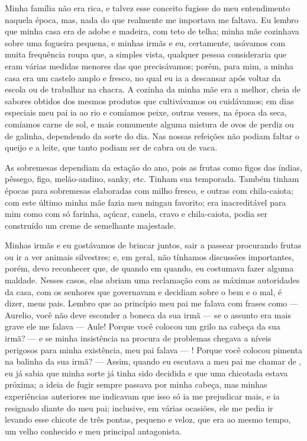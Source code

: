 Minha família não era rica, e talvez esse conceito fugisse do meu entendimento naquela época, mas, nada do que realmente me importava me faltava.
Eu lembro que minha casa era de adobe e madeira, com teto de telha; minha mãe cozinhava sobre uma fogueira pequena, e minhas irmãs e eu, certamente, usávamos com muita frequência roupa que, a simples vista, qualquer pessoa consideraria que eram várias medidas menores das que precisávamos;
porém, para mim, a minha casa era um castelo amplo e fresco, no qual eu ia a descansar após voltar da escola ou de trabalhar na chacra. 
A cozinha da minha mãe era a melhor, cheia de sabores obtidos dos mesmos produtos que cultivávamos ou cuidávamos; em dias especiais meu pai ia ao rio e comíamos peixe, outras vesses, na época da seca, comíamos carne de sol, e mais comumente alguma mistura de ovos de perdiz ou de galinha, dependendo da sorte do dia.
Nas nossas refeições não podiam faltar o queijo e a leite, que tanto podiam ser de cabra ou de vaca.
\begin{comment}
\begin{wrapfigure}{r}{0.35\textwidth}
  \vspace{-10pt}
  \begin{center}
    \texttt{[image: opuntia.eps]}
    \caption{Figo das índias.}
  \end{center}
  \vspace{-30pt}
\end{wrapfigure}
\end{comment}
As sobremesas dependiam da estação do ano, pois as frutas como figos das índias, pêssego, figo, melão-andino, sanky, etc. Tinham sua temporada. Também tinham épocas para sobremesas elaboradas com milho fresco, e outras com chila-caiota; com este último minha mãe fazia meu mingau favorito; era inacreditável para mim como com só farinha, açúcar, canela, cravo e chila-caiota, podia ser construído um creme de semelhante majestade.

Minhas irmãs e eu gostávamos de brincar juntos, sair a passear procurando frutas ou ir a ver animais silvestres; e, em geral, não tínhamos discussões importantes, porém, devo reconhecer que, de quando em quando, eu costumava fazer alguma maldade.
Nesses casos, elas abriam uma reclamação com as máximas autoridades da casa, com os senhores que governavam e decidiam sobre o bem e o mal, é dizer, meus pais. Lembro que ao princípio meu pai me falava com frases como --- Aurelio, você não deve esconder a boneca da sua irmã --- se o assunto era mais grave ele me falava --- Aule! Porque você colocou um grilo na cabeça da sua irmã? --- e se minha insistência na procura de problemas chegava a níveis perigosos para minha existência, meu pai falava --- \Aulicha! Porque você colocou pimenta na balinha da sua irmã? ---
Assim, quando eu escutava a meu pai me chamar de \Aulicha, eu já sabia que minha sorte já tinha sido decidida e que uma chicotada estava próxima; a ideia de fugir sempre passava por minha cabeça, mas minhas experiências anteriores me indicavam que isso só ia me prejudicar mais, e ia resignado diante do meu pai; inclusive, em várias ocasiões, ele me pedia ir levando esse chicote de três pontas, pequeno e veloz, que era ao mesmo tempo, um velho conhecido e meu principal antagonista.

